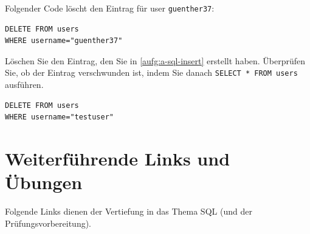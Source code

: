 \begin{myexample}
Folgender Code löscht den Eintrag für user \texttt{guenther37}:
\begin{lstlisting}
DELETE FROM users
WHERE username="guenther37"
\end{lstlisting}
\end{myexample}

\begin{myexercise}
  Löschen Sie den Eintrag, den Sie in \cref{aufg:a-sql-insert} erstellt haben. Überprüfen Sie, ob der Eintrag verschwunden ist, indem Sie danach \lstinline|SELECT * FROM users| ausführen.
  \begin{myanswer}
    \begin{lstlisting}
DELETE FROM users
WHERE username="testuser"
\end{lstlisting}
  \end{myanswer}
\end{myexercise}

\section{Weiterführende Links und Übungen}
Folgende Links dienen der Vertiefung in das Thema \gls{SQL} (und der Prüfungsvorbereitung).

